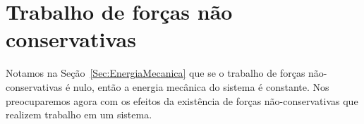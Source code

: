 


\section{Trabalho de forças não conservativas}
\label{Sec:TrabalhoForcasNaoConservativas}

Notamos na Seção~\ref{Sec:EnergiaMecanica} que se o trabalho de forças não-conservativas é nulo, então a energia mecânica do sistema é constante. Nos preocuparemos agora com os efeitos da existência de forças não-conservativas que realizem trabalho em um sistema.

